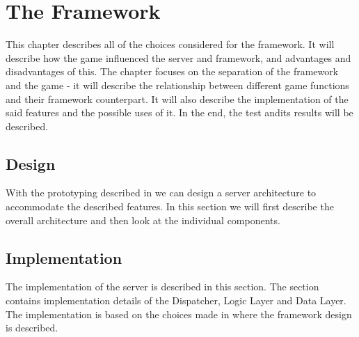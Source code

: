 \chapter{The Framework}

This chapter describes all of the choices considered for the framework. It will describe how the game influenced the server and framework, and advantages and disadvantages of this. The chapter focuses on the separation of the framework and the game - it will describe the relationship between different game functions and their framework counterpart. It will also describe the implementation of the said features and the possible uses of it. In the end, the test andits results will be described.

\section{Design}\label{sec:desFram}
With the prototyping described in  we can design a server architecture to accommodate the described features. In this section we will first describe the overall architecture and then look at the individual components.


\section{Implementation}
The implementation of the server is described in this section. The section contains implementation details of the Dispatcher, Logic Layer and Data Layer.\\

The implementation is based on the choices made in  where the framework design is described.


